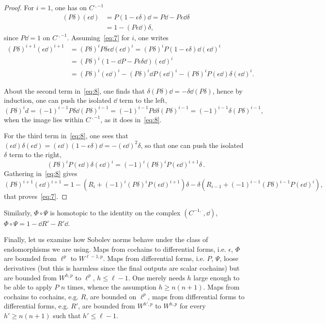 \begin{proof}
For $i=1$, one has on $C^{\cdot,-1}$
\begin{align*}
(P \delta) (\epsilon \dd) & = P(1 - \epsilon \delta)\dd = P\dd - P\epsilon \dd \delta \\
& = 1 - (P\epsilon \dd) \delta,
\end{align*}
since $P\dd = 1$ on $C^{\cdot,-1}$. Assuming~\eqref{eq:7} for $i$, one writes
\begin{align}
(P\delta)^{i+1} (\epsilon \dd)^{i+1} & = (P \delta)^i P\delta
\epsilon \dd (\epsilon \dd)^i = (P \delta)^i P(1 - \epsilon
\delta) \dd (\epsilon \dd)^i \nonumber \\
& = (P
\delta)^i (1 - \dd P - P \epsilon \delta \dd) (\epsilon \dd)^i
\nonumber \\
& = (P \delta)^i (\epsilon \dd)^i - (P \delta)^i \dd P (\epsilon \dd)^i - (P \delta)^i P (\epsilon \dd) \delta (\epsilon \dd)^i.\label{eq:8}
\end{align}

About the second term in~\eqref{eq:8}, one finds that $\delta(P\delta) \dd = - \delta \dd (P\delta)$, hence by induction, one can push the isolated $\dd$ term to the left,
\[
(P \delta)^i d = (-1)^{i-1} P\delta \dd (P\delta)^{i-1} = (-1)^{i-1} P\dd \delta (P\delta)^{i-1} = (-1)^{i-1}\delta (P\delta)^{i-1},
\]
when the image lies within $C^{\cdot,-1}$, as it does in~\eqref{eq:8}.

For the third term in~\eqref{eq:8}, one sees that $(\epsilon \dd) \delta (\epsilon \dd) = (\epsilon \dd)(1 - \epsilon \delta) \dd = - (\epsilon \dd)^2 \delta$, so that one can push the isolated $\delta$ term to the right,
\[
(P \delta)^i P (\epsilon \dd) \delta (\epsilon \dd)^i = (-1)^i (P \delta)^i P (\epsilon \dd)^{i+1} \delta \,.
\]
Gathering in~\eqref{eq:8} gives
\[
(P\delta)^{i+1} (\epsilon \dd)^{i+1} = 1 - (R_i + (-1)^i (P\delta)^i P (\epsilon \dd)^{i+1}) \delta - \delta (R_{i-1} + (-1)^{i-1} (P\delta)^{i-1} P (\epsilon \dd)^i),
\]
that proves~\eqref{eq:7}.
\end{proof}

Similarly, $\Phi\circ\Psi$ is homotopic to the identity on the complex $(C^{-1,\cdot},\dd)$, $\Phi\circ\Psi=1-\dd R'-R'\dd$.

Finally, let us examine how Sobolev norms behave under the class of endomorphisms we are using. Maps from cochains to differential forms, i.e. $\epsilon$, $\Phi$ are bounded from $\ell^p$ to $W^{\ell-1,p}$. Maps from differential forms, i.e. $P$, $\Psi$, loose derivatives (but this is harmless since the final outputs are scalar cochains) but are bounded from $W^{h,p}$ to $\ell^p$, $h\leq \ell-1$. One merely needs $h$ large enough to be able to apply $P$ $n$ times, whence the assumption $h\geq n(n+1)$. Maps from cochains to cochains, e.g. $R$, are bounded on $\ell^p$, maps from differential forms to differential forms, e.g. $R'$, are bounded from $W^{h',p}$ to $W^{h,p}$ for every $h'\geq n(n+1)$ such that $h'\leq \ell-1$.

